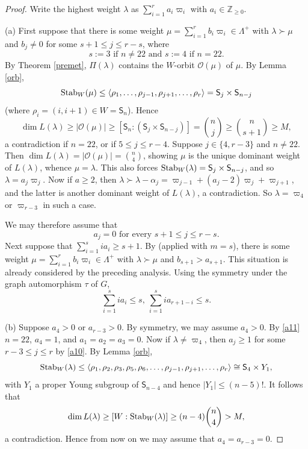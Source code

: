 \documentclass[11pt]{amsart}
\theoremstyle{plain}
\theoremstyle{definition}
\numberwithin{thm}{section}
\numberwithin{equation}{thm}
\newcommand{\al}{\alpha}
\newcommand{\om}{\varpi}
\newcommand{\Stab}{{\rm Stab}}
\newcommand{\sO}{{\mathcal O}}
\newcommand{\Z}{{\mathbb Z}}
\newcommand{\0}{\emptyset}
\newcommand{\SBS}{\mathsf{S}}
\newcommand{\LP}{{\Lambda^{+}}}
\newcommand{\lam}{\lambda}
\begin{document}
\begin{proof}
Write the highest weight $\lam$ as $\sum^r_{i=1}a_i\om_i$ with $a_i \in \Z_{\geq 0}$.

\smallskip
(a) First suppose that there is some weight $\mu=\sum^r_{i=1}b_i\om_i \in \LP$ with $\lam \succ \mu$ and $b_j \neq 0$ for 
some $s+1 \leq j \leq r-s$, where 
$$s := 3 \mbox{ if }n \neq 22 \mbox{ and }s:=4 \mbox{ if }n=22.$$ 
By Theorem \ref{premet}, $\Pi(\lam)$ contains the $W$-orbit $\sO(\mu)$ of $\mu$. By Lemma \ref{orb},
$$\Stab_W(\mu) \leq \langle \rho_1, \ldots,\rho_{j-1}, \rho_{j+1}, \ldots,\rho_r \rangle = \SBS_{j} \times \SBS_{n-j}$$
(where $\rho_i = (i,i+1) \in W = \SBS_n$). Hence 
$$\dim L(\lam) \geq |\sO(\mu)| \geq [\SBS_n:(\SBS_j \times \SBS_{n-j})] = \binom{n}{j} \geq \binom{n}{s+1} \geq M,$$
a contradiction if $n = 22$, or if $5 \leq j \leq r-4$. Suppose $j \in \{4,r-3\}$ and $n \neq 22$. Then %
$\dim L(\lam) = |\sO(\mu)| = \binom{n}{4}$, showing $\mu$ is the unique dominant weight of $L(\lam)$, whence $\mu=\lam$.
This also forces $\Stab_W(\lam) =  \SBS_{j} \times \SBS_{n-j}$, and so $\lam = a_j\om_j$. Now if $a \geq 2$, then 
$\lam \succ \lam-\al_j =\om_{j-1}+(a_j-2)\om_j+\om_{j+1}$, and the latter is another dominant weight of $L(\lam)$, a contradiction.
So $\lam=\om_4$ or $\om_{r-3}$ in such a case.

We may therefore assume that
\begin{equation}\label{a10}
  a_j = 0 \mbox{ for every }s+1 \leq j \leq r-s.
\end{equation}  
Next suppose that $\sum^s_{i=1}ia_i \geq s+1$. By \cite[Lemma 2.6]{GLT} (applied with $m=s$),  there is some weight 
$\mu=\sum^r_{i=1}b_i\om_i \in \LP$ with $\lam \succ \mu$ and $b_{s+1} > a_{s+1}$. This situation 
is already considered by the preceding analysis. 
Using the symmetry under the graph automorphism $\tau$ of $G$, %
\begin{equation}\label{a11}
  \sum^s_{i=1}ia_i \leq s,~\sum^s_{i=1}ia_{r+1-i} \leq s.  
\end{equation}

\smallskip
(b) Suppose $a_4 > 0$ or $a_{r-3} > 0$. By symmetry, we may assume $a_4> 0$. By \eqref{a11} $n=22$,
$a_4=1$, and $a_1=a_2=a_3=0$. Now if $\lam \neq \om_4$, then $a_j \geq 1$ for some $r-3 \leq j \leq r$ by \eqref{a10}. 
By Lemma \ref{orb}, 
$$\Stab_W(\lam) \leq \langle \rho_1,\rho_2,\rho_3, \rho_5, \rho_6, \ldots,\rho_{j-1},\rho_{j+1}, \ldots,\rho_r \rangle 
   \cong \SBS_4 \times Y_1,$$
with $Y_1$ a proper Young subgroup of $\SBS_{n-4}$ and hence $|Y_1| \leq (n-5)!$. It follows that 
$$\dim L(\lam) \geq [W:\Stab_W(\lam)] \geq (n-4)\binom{n}{4} > M,$$ 
a contradiction. Hence from now on we may assume that $a_4=a_{r-3}=0$.


\end{proof}
\end{document}
